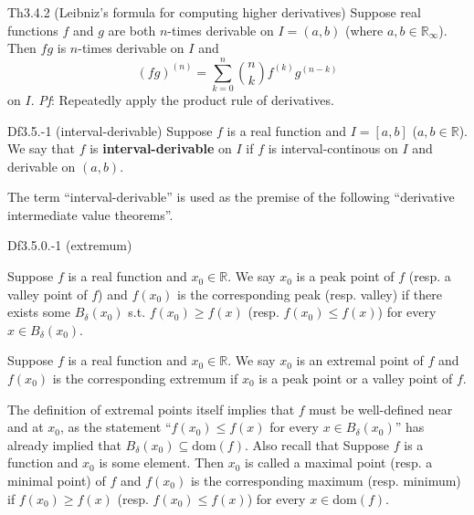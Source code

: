 \documentclass{article}
\begin{document}
\begin{Th}{Th3.4.2 (Leibniz's formula for computing higher derivatives)}
    Suppose real functions $f$ and $g$ are both $n$-times derivable on $I = (a,b)$ (where $a, b\in\mathbb{R}_\infty$). Then $fg$ is $n$-times derivable on $I$ and
    $$ (fg)^{(n)} = \sum_{k=0}^n \binom{n}{k} f^{(k)}g^{(n-k)}$$
    on $I$.
    \tcblower
    \textit{Pf}: Repeatedly apply the product rule of derivatives.
\end{Th}

\begin{Df}{Df3.5.-1 (interval-derivable)}
    Suppose $f$ is a real function and $I=[a,b]$ ($a,b\in\mathbb{R}$). We say that $f$ is \textbf{interval-derivable} on $I$ if $f$ is interval-continous on $I$ and derivable on $(a,b)$.
\end{Df}

\begin{Rmk}{}
    The term ``interval-derivable'' is used as the premise of the following ``derivative intermediate value theorems''.
\end{Rmk}

\begin{Df}{Df3.5.0.-1 (extremum)}
    \begin{compactenum}
        \item Suppose $f$ is a real function and $x_0\in\mathbb{R}$. We say $x_0$ is a peak point of $f$ (resp. a valley point of $f$) and $f(x_0)$ is the corresponding peak (resp. valley) if there exists some $B_\delta(x_0)$ s.t. $f(x_0)\geq f(x)$ (resp. $f(x_0)\leq f(x)$) for every $x\in B_\delta(x_0)$.
        \item Suppose $f$ is a real function and $x_0\in\mathbb{R}$. We say $x_0$ is an extremal point of $f$ and $f(x_0)$ is the corresponding extremum if $x_0$ is a peak point or a valley point of $f$.
    \end{compactenum}
\end{Df}

\begin{Rmk}{}
    \textcolor{Th}{The definition of extremal points itself implies that $f$ must be well-defined near and at $x_0$,} as the statement ``$f(x_0)\leq f(x)$ for every $x\in B_\delta(x_0)$'' has already implied that $B_\delta(x_0)\subseteq\text{dom}(f)$. Also recall that \textcolor{Df}{Suppose $f$ is a function and $x_0$ is some element. Then $x_0$ is called a maximal point (resp. a minimal point) of $f$ and $f(x_0)$ is the corresponding maximum (resp. minimum) if $f(x_0)\geq f(x)$ (resp. $f(x_0)\leq f(x)$) for every $x\in \text{dom}(f)$.}
\end{Rmk}
\end{document}
